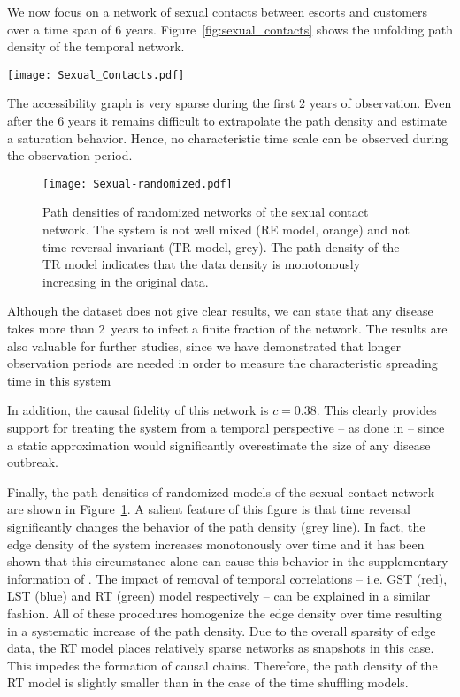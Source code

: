 We now focus on a network of sexual contacts between escorts and customers over a time span of 6 years.
Figure~\ref{fig:sexual_contacts} shows the unfolding path density of the temporal network.
%
\begin{SCfigure}
\texttt{[image: Sexual\_Contacts.pdf]}
\caption{Path density and shortest path duration distribution for a network of sexual contacts.
Despite the long observation period, the path density does neither saturate nor it reveals a characteristic time scale.}
\label{fig:sexual_contacts}
\end{SCfigure}
%
The accessibility graph is very sparse during the first 2 years of observation.
Even after the 6 years it remains difficult to extrapolate the path density and estimate a saturation behavior.
Hence, no characteristic time scale can be observed during the observation period.
%
\begin{figure}[htb!]
\begin{center}
\texttt{[image: Sexual-randomized.pdf]}
\caption{Path densities of randomized networks of the sexual contact network.
The system is not well mixed (RE model, orange) and not time reversal invariant (TR model, grey).
The path density of the TR model indicates that the data density is monotonously increasing in the original data.}
\label{fig:sexual_randomized}
\end{center}
\end{figure}
%
Although the dataset does not give clear results, we can state that any disease takes more than 2~years to infect a finite fraction of the network.
The results are also valuable for further studies, since we have demonstrated that longer observation periods are needed in order to measure the characteristic spreading time in this system

In addition, the causal fidelity of this network is $c=0.38$.
This clearly provides support for treating the system from a temporal perspective -- as done in \citep{Rocha_pnas} -- since a static approximation would significantly overestimate the size of any disease outbreak.

Finally, the path densities of randomized models of the sexual contact network are shown in Figure~\ref{fig:sexual_randomized}.
A salient feature of this figure is that time reversal significantly changes the behavior of the path density (grey line).
In fact, the edge density of the system increases monotonously over time and it has been shown that this circumstance alone can cause this behavior in the supplementary information of \citet{Lentz:2013PRL}.
The impact of removal of temporal correlations -- i.e. GST (red), LST (blue) and RT (green) model respectively -- can be explained in a similar fashion.
All of these procedures homogenize the edge density over time resulting in a systematic increase of the path density.
Due to the overall sparsity of edge data, the RT model places relatively sparse networks as snapshots in this case.
This impedes the formation of causal chains.
Therefore, the path density of the RT model is slightly smaller than in the case of the time shuffling models.

